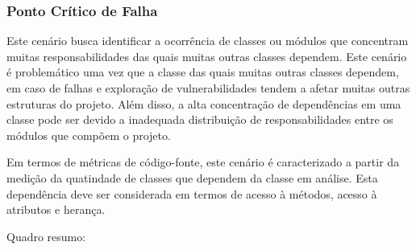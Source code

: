 \subsubsection{Ponto Crítico de Falha}

Este cenário busca identificar a ocorrência de classes ou módulos que concentram muitas responsabilidades das quais muitas outras classes dependem. Este cenário é problemático uma vez que a classe das quais muitas outras classes dependem, em caso de falhas e exploração de vulnerabilidades tendem a afetar muitas outras estruturas do projeto. Além disso, a alta concentração de dependências em uma classe pode ser devido a inadequada distribuição de responsabilidades entre os módulos que compõem o projeto.

Em termos de métricas de código-fonte, este cenário é caracterizado a partir da medição da quatindade de classes que dependem da classe em análise. Esta dependência deve ser considerada em termos de acesso à métodos, acesso à atributos e herança. 

Quadro resumo:

